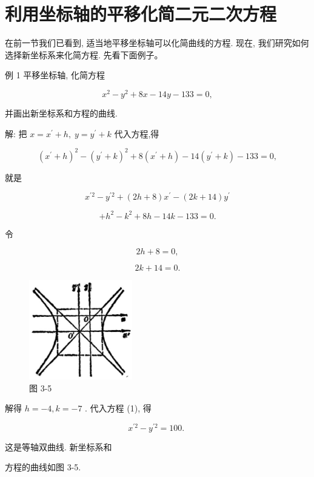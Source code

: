 \documentclass[lang=cn,newtx,10.5pt,scheme=chinese]{elegantbook}
\begin{document}
\section{利用坐标轴的平移化简二元二次方程}

在前一节我们已看到, 适当地平移坐标轴可以化简曲线的方程. 现在, 我们研究如何选择新坐标系来化简方程. 先看下面例子。

例 1 平移坐标轴, 化简方程

\[
    {x}^{2} - {y}^{2} + {8x} - {14y} - {133} = 0,
\]

并画出新坐标系和方程的曲线.

解: 把 \(x = {x}^{\prime } + h,\;y = {y}^{\prime } + k\) 代入方程,得

\[
    {\left( {x}^{\prime } + h\right) }^{2} - {\left( {y}^{\prime } + k\right) }^{2} + 8\left( {{x}^{\prime } + h}\right) - {14}\left( {{y}^{\prime } + k}\right) - {133} = 0,
\]

就是

\[
    {x}^{\prime 2} - {y}^{\prime 2} + \left( {{2h} + 8}\right) {x}^{\prime } - \left( {{2k} + {14}}\right) {y}^{\prime }
\]

\[
  + {h}^{2} - {k}^{2} + {8h} - {14k} - {133} = 0. \tag{1}
\]

令

\[
    {2h} + 8 = 0,
\]

\[
    {2k} + {14} = 0\text{.}
\]

\begin{figure}[h]
  \centering
  \includegraphics[max width=0.4\textwidth]{images/01912cc2-ffb6-728e-9ae7-b113ff05c64b_136_802845.jpg}
  \caption{图 3-5}
\end{figure}



解得 \(h = - 4,k = - 7\) . 代入方程 (1), 得

\[
    {x}^{\prime 2} - {y}^{\prime 2} = {100}\text{. }
\]

这是等轴双曲线. 新坐标系和

方程的曲线如图 3-5.
\end{document}
